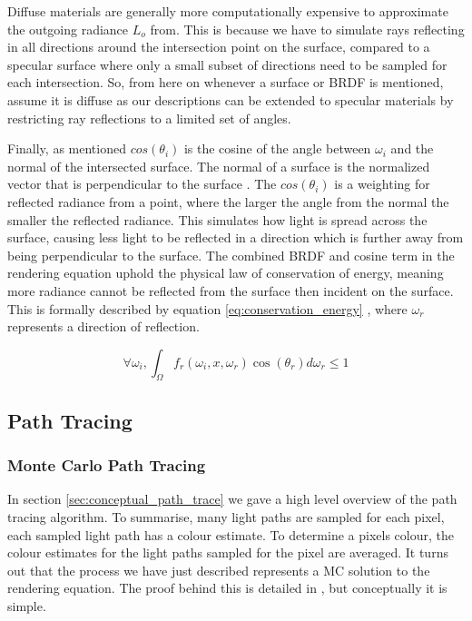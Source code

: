 \documentclass[../dissertation.tex]{subfiles}
\begin{document}
Diffuse materials are generally more computationally expensive to approximate the outgoing radiance $L_o$ from. This is because we have to simulate rays reflecting in all directions around the intersection point on the surface, compared to a specular surface where only a small subset of directions need to be sampled for each intersection. So, from here on whenever a surface or BRDF is mentioned, assume it is diffuse as our descriptions can be extended to specular materials by restricting ray reflections to a limited set of angles.

Finally, as mentioned $cos(\theta_i)$ is the cosine of the angle between $\omega_i$ and the normal of the intersected surface. The normal of a surface is the normalized vector that is perpendicular to the surface \cite{normals}. The $cos(\theta_i)$ is a weighting for reflected radiance from a point, where the larger the angle from the normal the smaller the reflected radiance. This simulates how light is spread across the surface, causing less light to be reflected in a direction which is further away from being perpendicular to the surface. The combined BRDF and cosine term in the rendering equation uphold the physical law of conservation of energy, meaning more radiance cannot be reflected from the surface then incident on the surface. This is formally described by equation \ref{eq:conservation_energy} \cite{glassner2014principles}, where $\omega_r$ represents a direction of reflection.

\begin{equation}
\forall \omega_i, \int_\Omega f_r(\omega_i, x, \omega_r) \cos(\theta_r) d\omega_r \leq 1
\label{eq:conservation_energy}
\end{equation}

\subsection{Path Tracing}

\subsubsection{Monte Carlo Path Tracing}
\label{sec:monte_carlo_path_tracing}

In section \ref{sec:conceptual_path_trace} we gave a high level overview of the path tracing algorithm. To summarise, many light paths are sampled for each pixel, each sampled light path has a colour estimate. To determine a pixels colour, the colour estimates for the light paths sampled for the pixel are averaged. It turns out that the process we have just described represents a MC solution to the rendering equation. The proof behind this is detailed in \cite{stanford_graphics}, but conceptually it is simple. 
\end{document}
